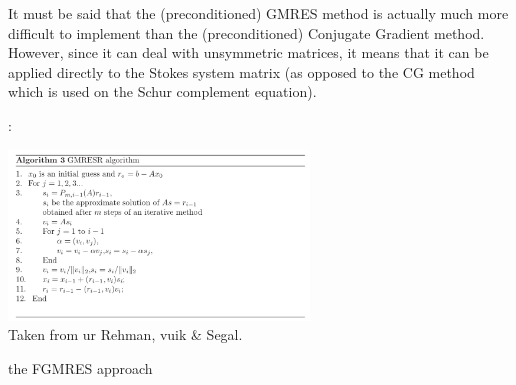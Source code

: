 It must be said that the (preconditioned) GMRES method is actually 
much more difficult to implement 
than the (preconditioned) Conjugate Gradient method.
However, since it can deal with unsymmetric matrices, it means that it can be applied 
directly to the Stokes system matrix (as opposed to the CG method which 
is used on the Schur complement equation).

 

\Literature: \cite[p208]{eijkhout} \cite{saad,saad93} \cite{babc94} \cite{ayac03}







 









\begin{center}
\includegraphics[width=8cm]{images/solvers/GMRESR}\\
{\captionfont Taken from ur Rehman, vuik \& Segal.}
\end{center}

the FGMRES approach \cite{deit13}

\Literature \cite{pasa75,mamo08,fumt11,knke04,kool00,kopo93} 

